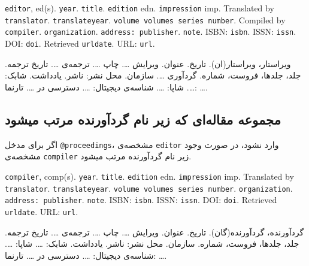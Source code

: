 \documentclass[a4paper,11pt]{article}
\begin{document}
\begin{itemize}[nosep]
\begin{latin}
\item[] []
{\tt editor}, ed(s). {\tt year}. {\tt title}. {\tt edition} edn. {\tt impression} imp. Translated by {\tt translator}. {\tt translateyear}. {\tt volume volumes series number}. Compiled by {\tt compiler}. {\tt organization}. {\tt address: publisher}. {\tt note}. ISBN: {\tt isbn}. ISSN: {\tt issn}. DOI: {\tt doi}. Retrieved {\tt urldate}. URL: {\tt url}. 
\end{latin}

\item[] []
{\persianttfamily ویراستار}، ویراستار(ان). {\persianttfamily تاریخ}. {\persianttfamily عنوان}. ویرایش {\persianttfamily …}. چاپ {\persianttfamily …}. ترجمه‌ی {\persianttfamily …}. {\persianttfamily تاریخ ترجمه}. {\persianttfamily جلد، جلدها، فروست، شماره}. گردآوری {\persianttfamily …}. {\persianttfamily سازمان}. {\persianttfamily محل نشر: ناشر}. {\persianttfamily یادداشت}. شابک: {\persianttfamily …}. شاپا: {\persianttfamily …}. شناسه‌ی دیجیتال: {\persianttfamily …}. دسترسی در {\persianttfamily …}. تارنما: {\persianttfamily …}. 
\end{itemize}





\subsection{مجموعه مقاله‌ای که زیر نام گردآورنده مرتب میشود}
اگر برای مدخل \verb|@proceedings|، مشخصه‌ی \verb|editor| وارد نشود، در صورت وجود مشخصه‌ی \verb|compiler| زیر نام گردآورنده مرتب میشود.

\begin{itemize}[nosep]
\begin{latin}
\item[] []
{\tt compiler}, comp(s). {\tt year}. {\tt title}. {\tt edition} edn. {\tt impression} imp. Translated by {\tt translator}. {\tt translateyear}. {\tt volume volumes series number}. {\tt organization}. {\tt address: publisher}. {\tt note}. ISBN: {\tt isbn}. ISSN: {\tt issn}. DOI: {\tt doi}. Retrieved {\tt urldate}. URL: {\tt url}. 
\end{latin}

\item[] []
{\persianttfamily گردآورنده}، گردآورنده(گان). {\persianttfamily تاریخ}. {\persianttfamily عنوان}. ویرایش {\persianttfamily …}. چاپ {\persianttfamily …}. ترجمه‌ی {\persianttfamily …}. {\persianttfamily تاریخ ترجمه}. {\persianttfamily جلد، جلدها، فروست، شماره}. {\persianttfamily سازمان}. {\persianttfamily محل نشر: ناشر}. {\persianttfamily یادداشت}. شابک: {\persianttfamily …}. شاپا: {\persianttfamily …}. شناسه‌ی دیجیتال: {\persianttfamily …}. دسترسی در {\persianttfamily …}. تارنما: {\persianttfamily …}. 
\end{itemize}
\end{document}
